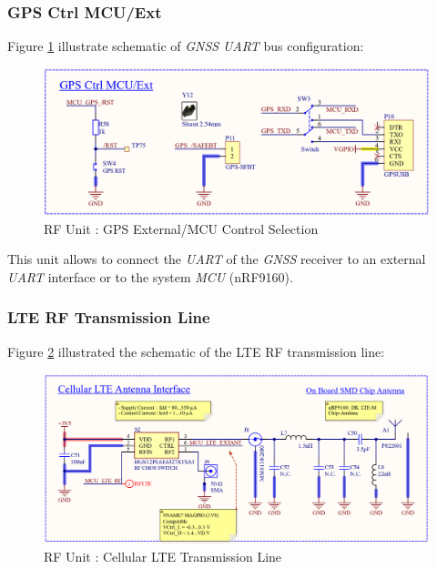 \documentclass[report.tex]{subfiles}
\begin{document}
\subsubsection{GPS Ctrl MCU/Ext}

Figure \ref{fig:LTEWatch_LTEW_RF_Unit_GPS_Ctrl_MCU-EXT} illustrate schematic of \textit{GNSS} \textit{UART}
bus configuration:

\begin{figure}[H]
	\centering
	\includegraphics[width=1\textwidth]{Include/Figure/Hardware/LTEWatch_LTEW_RF_Unit_GPS_Ctrl_MCU-EXT}
	\caption{RF Unit : GPS External/MCU Control Selection}
	\label{fig:LTEWatch_LTEW_RF_Unit_GPS_Ctrl_MCU-EXT}
\end{figure}

This unit allows to connect the \textit{UART} of the \textit{GNSS} receiver to an external \textit{UART} interface or to the system \textit{MCU} (nRF9160). 

\subsubsection{LTE RF Transmission Line}

Figure \ref{fig:LTEWatch_LTEW_RF_Unit_Cellular_LTE_Antenna_Interface} illustrated the schematic of the LTE RF transmission line:

\begin{figure}[H]
	\centering
	\includegraphics[width=1\textwidth]{Include/Figure/Hardware/LTEWatch_LTEW_RF_Unit_Cellular_LTE_Antenna_Interface}
	\caption{RF Unit : Cellular LTE Transmission Line}
	\label{fig:LTEWatch_LTEW_RF_Unit_Cellular_LTE_Antenna_Interface}
\end{figure}
\end{document}
